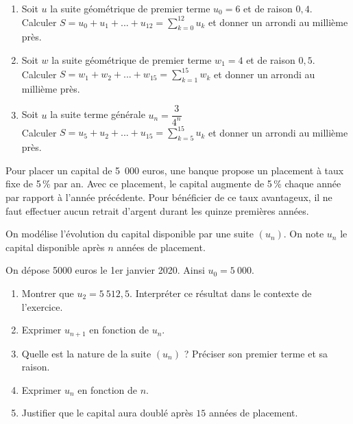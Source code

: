 \documentclass[11pt]{article}
\begin{document}
\begin{exercicedevoir}[6]
\begin{enumerate}
\item Soit $u$ la suite géométrique de premier terme $u_0 = 6$ et de raison $0{,}4$.\\Calculer $\displaystyle S = u_0 + u_1 + ... + u_{12} =\sum_{k=0}^{12}u_k$ et donner un arrondi au millième près.
\item Soit $w$ la suite géométrique de premier terme $w_1 = 4$ et de
raison $0{,}5$.\\Calculer
$\displaystyle S = w_1 + w_2 + ... + w_{15} =\sum_{k=1}^{15}w_k$ et
donner un arrondi au millième près.
\item Soit $u$ la suite terme générale $u_n = \dfrac{3}{4^n}$\\
Calculer $\displaystyle S = u_5 + u_2 + ... + u_{15} =\sum_{k=5}^{15}u_k$ et
donner un arrondi au millième près.
\end{enumerate}
\end{exercicedevoir}

\begin{exercicedevoir}[6]
Pour placer un capital de 5~000 euros, une banque propose un placement à taux fixe de 5\,\%
par an. Avec ce placement, le capital augmente de 5\,\% chaque année par rapport à l'année
précédente. Pour bénéficier de ce taux avantageux, il ne faut effectuer aucun retrait
d'argent durant les quinze premières années.

On modélise l'évolution du capital disponible par une suite $\left(u_n\right)$. On note $u_n$ le capital
disponible après $n$ années de placement.

On dépose 5000 euros le 1er janvier 2020. Ainsi $u_0 = 5~000 $.

\medskip

\begin{enumerate}
\item Montrer que $u_2 = 5~512,5$. Interpréter ce résultat dans le contexte de l'exercice.
\item Exprimer $u_{n+1}$ en fonction de $u_n$.
\item Quelle est la nature de la suite $\left(u_n\right)$ ? Préciser son premier terme et sa raison.
\item Exprimer $u_n$ en fonction de $n$.
\item Justifier que le capital aura doublé après $15$ années de placement.
\end{enumerate}
\end{exercicedevoir}
\end{document}
